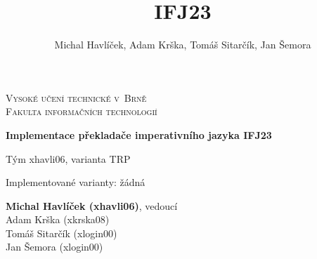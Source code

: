 \documentclass[12pt,a4paper]{article}
\author{Michal Havlíček, Adam Krška, Tomáš Sitarčík, Jan Šemora}
\title{IFJ23}
\begin{document}
\makeatletter
\begin{titlepage}
\begin{center}
	{\Huge\textsc{Vysoké učení technické v~Brně}\\[0.4em]
	\LARGE\textsc{Fakulta informačních technologií}}


	{\bfseries\LARGE Implementace překladače imperativního jazyka IFJ23}

	\vspace{1cm}

	{\LARGE Tým xhavli06, varianta TRP}
	\vspace{1cm}

	{\large Implementované varianty: žádná}

	{
		\large
		\textbf{Michal Havlíček (xhavli06)}, vedoucí\\
		Adam Krška (xkrska08)\\
		Tomáš Sitarčík (xlogin00)\\
		Jan Šemora (xlogin00)
	}
\end{center}
\end{titlepage}
\makeatother

\tableofcontents



\end{document}

